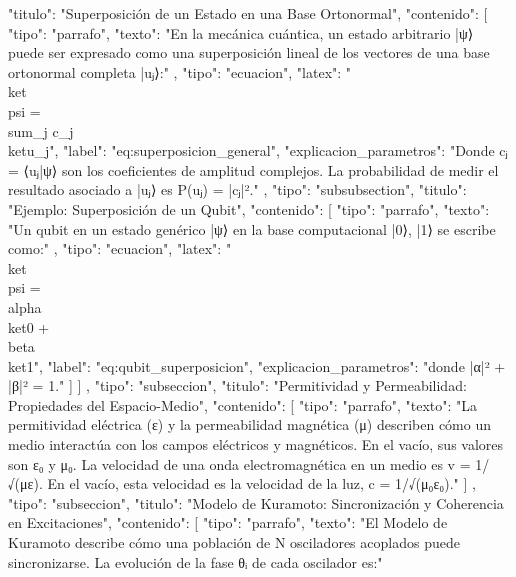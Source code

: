 \documentclass{article}
\begin{document}
{{{          "titulo": "Superposición de un Estado en una Base Ortonormal",
          "contenido": [
            {
              "tipo": "parrafo",
              "texto": "En la mecánica cuántica, un estado arbitrario |ψ⟩ puede ser expresado como una superposición lineal de los vectores de una base ortonormal completa {|uⱼ⟩}:"
            },
            {
              "tipo": "ecuacion",
              "latex": "\\ket{\\psi} = \\sum_{j} c_j \\ket{u_j}",
              "label": "eq:superposicion_general",
              "explicacion_parametros": "Donde cⱼ = ⟨uⱼ|ψ⟩ son los coeficientes de amplitud complejos. La probabilidad de medir el resultado asociado a |uⱼ⟩ es P(uⱼ) = |cⱼ|²."
            },
            {
              "tipo": "subsubsection",
              "titulo": "Ejemplo: Superposición de un Qubit",
              "contenido": [
                {
                  "tipo": "parrafo",
                  "texto": "Un qubit en un estado genérico |ψ⟩ en la base computacional {|0⟩, |1⟩} se escribe como:"
                },
                {
                  "tipo": "ecuacion",
                  "latex": "\\ket{\\psi} = \\alpha \\ket{0} + \\beta \\ket{1}",
                  "label": "eq:qubit_superposicion",
                  "explicacion_parametros": "donde |α|² + |β|² = 1."
                }
              ]
            }
          ]
        },
        {
          "tipo": "subseccion",
          "titulo": "Permitividad y Permeabilidad: Propiedades del Espacio-Medio",
          "contenido": [
            {
              "tipo": "parrafo",
              "texto": "La permitividad eléctrica (ε) y la permeabilidad magnética (μ) describen cómo un medio interactúa con los campos eléctricos y magnéticos. En el vacío, sus valores son ε₀ y μ₀. La velocidad de una onda electromagnética en un medio es v = 1/√(με). En el vacío, esta velocidad es la velocidad de la luz, c = 1/√(μ₀ε₀)."
            }
          ]
        },
        {
          "tipo": "subseccion",
          "titulo": "Modelo de Kuramoto: Sincronización y Coherencia en Excitaciones",
          "contenido": [
            {
              "tipo": "parrafo",
              "texto": "El Modelo de Kuramoto describe cómo una población de N osciladores acoplados puede sincronizarse. La evolución de la fase θᵢ de cada oscilador es:"
}}}}
\end{document}
